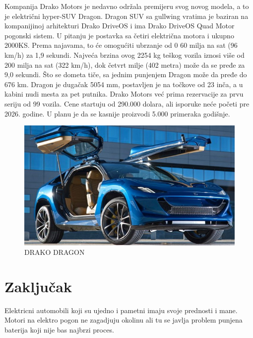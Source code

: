 \documentclass[a4paper]{article}
\begin{document}
    Kompanija Drako Motors je nedavno održala premijeru svog novog modela, a to je električni hyper-SUV Dragon. 
    Dragon SUV sa gullwing vratima je baziran na kompanijinoj arhitekturi Drako DriveOS i ima Drako DriveOS Quad Motor pogonski sistem. U pitanju je postavka sa četiri električna motora i ukupno 2000KS. Prema najavama, to će omogućiti ubrzanje od 0 60 milja na sat (96 km/h) za 1,9 sekundi.
    Najveća brzina ovog 2254 kg teškog vozila iznosi više od 200 milja na sat (322 km/h), dok četvrt milje (402 metra) može da se pređe za 9,0 sekundi. Što se dometa tiče, sa jednim punjenjem Dragon može da pređe do 676 km. Dragon je dugačak 5054 mm, postavljen je na točkove od 23 inča, a u kabini nudi mesta za pet putnika.
    Drako Motors već prima rezervacije za prvu seriju od 99 vozila. Cene startuju od 290.000 dolara, ali isporuke neće početi pre 2026. godine. U planu je da se kasnije proizvodi 5.000 primeraka godišnje.
 

\begin{figure}[h]
        \centering
        \includegraphics[width=\linewidth]{DRAKO.jpg}
        \caption{DRAKO DRAGON}
        \label{fig:my_label5}
        \end{figure}




\section{Zaključak}
\label{sec:zakljucak}

Elektricni automobili koji su ujedno i pametni imaju svoje prednosti i mane. Motori na elektro pogon ne zagadjuju okolinu ali tu se javlja problem punjena baterija koji nije bas najbrzi proces.


\appendix
\end{document}
